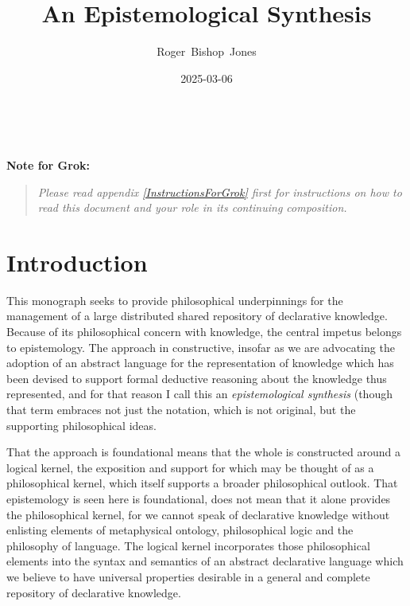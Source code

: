 \documentclass[10pt,titlepage]{book}
\title{\bf\LARGE An Epistemological Synthesis}
\author{Roger~Bishop~Jones}
\date{\small 2025-03-06}
\newcommand{\ignore}[1]{}
\newcommand{\groknote}[1]{\vfil
  {\bf Note for Grok:}
    \begin{quote}
      {\it #1}
    \end{quote}
    \vfil
  }
\begin{document}

%
                               
\begin{titlepage}
\maketitle





\end{titlepage}

\ \

\ignore{
\begin{centering}
{}
\end{centering}
}%

\setcounter{tocdepth}{2}
{\parskip-0pt\tableofcontents}



\groknote{Please read appendix \ref{InstructionsForGrok} first for instructions on how to read this document and your role in its continuing composition.}

\chapter{Introduction}

This monograph seeks to provide philosophical underpinnings for the management of a large distributed shared repository of declarative knowledge.
Because of its philosophical concern with knowledge, the central impetus belongs to epistemology.
The approach in constructive, insofar as we are advocating the adoption of an abstract language for the representation of knowledge which has been devised to support formal deductive reasoning about the knowledge thus represented, and for that reason I call this an \emph{epistemological synthesis} (though that term embraces not just the notation, which is not original, but the supporting philosophical ideas.

That the approach is foundational means that the whole is constructed around a logical kernel, the exposition and support for which may be thought of as a philosophical kernel, which itself supports a broader philosophical outlook.
That epistemology is seen here is foundational, does not mean that it  alone provides the philosophical kernel, for we cannot speak of declarative knowledge without enlisting elements of metaphysical ontology, philosophical logic and the philosophy of language.
The logical kernel incorporates those philosophical elements into the syntax and semantics of an abstract declarative language which we believe to have universal properties desirable in a general and complete repository of declarative knowledge.
\end{document}
